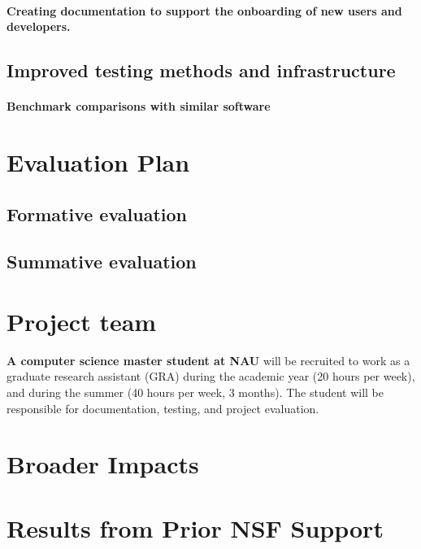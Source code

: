 \documentclass[numbers]{proposalnsf}
\begin{document}
\paragraph{Creating documentation to support the onboarding of new users and developers.} \label{sec:doc}

\subsection{Improved testing methods and infrastructure}

\paragraph{Benchmark comparisons with similar software}


\section{Evaluation Plan} \label{sec:eval}

\subsection{Formative evaluation}


\subsection{Summative evaluation}

\section{Project team}


\textbf{A computer science master student at NAU} will be recruited to work as a graduate research assistant (GRA) during the academic year (20 hours per week), and during the summer (40 hours per week, 3 months).
The student will be responsible for documentation, testing, and project evaluation.

\section{Broader Impacts}



\section{Results from Prior NSF Support}
\end{document}
